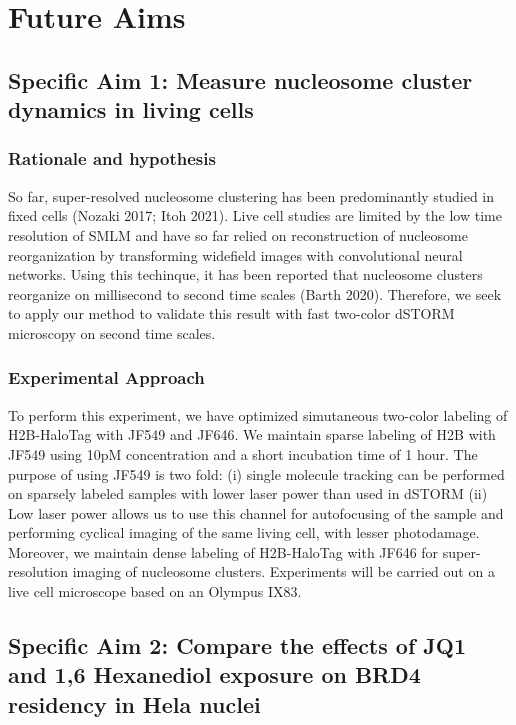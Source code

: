 \documentclass{ucetd}
\begin{document}
\section{Future Aims}

\subsection{Specific Aim 1: Measure nucleosome cluster dynamics in living cells}

\subsubsection{Rationale and hypothesis}

So far, super-resolved nucleosome clustering has been predominantly studied in fixed cells (Nozaki 2017; Itoh 2021). Live cell studies are limited by the low time resolution of SMLM and have so far relied on reconstruction of nucleosome reorganization by transforming widefield images with convolutional neural networks. Using this techinque, it has been reported that nucleosome clusters reorganize on millisecond to second time scales (Barth 2020).  Therefore, we seek to apply our method to validate this result with fast two-color dSTORM microscopy on second time scales. 

\subsubsection{Experimental Approach}

To perform this experiment, we have optimized simutaneous two-color labeling of H2B-HaloTag with JF549 and JF646. We maintain sparse labeling of H2B with JF549 using 10pM concentration and a short incubation time of 1 hour. The purpose of using JF549 is two fold: (i) single molecule tracking can be performed on sparsely labeled samples with lower laser power than used in dSTORM (ii) Low laser power allows us to use this channel for autofocusing of the sample and performing cyclical imaging of the same living cell, with lesser photodamage. Moreover, we maintain dense labeling of H2B-HaloTag with JF646 for super-resolution imaging of nucleosome clusters. Experiments will be carried out on a live cell microscope based on an Olympus IX83.


\subsection{Specific Aim 2: Compare the effects of JQ1 and 1,6 Hexanediol exposure on BRD4 residency in Hela nuclei}
\end{document}
